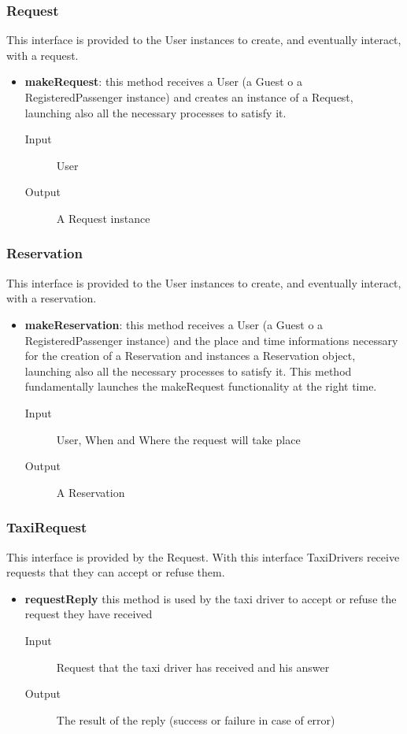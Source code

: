 		\subsubsection{Request}
		This interface is provided to the User instances to create, and eventually interact, with a request.
		\begin{itemize}
			\item \textbf{makeRequest}: this method receives a User (a Guest o a RegisteredPassenger instance)
			and creates	an instance of a Request, launching also all the necessary processes to satisfy it.
			\begin{description}
				\item[Input] User
				\item[Output] A Request instance
			\end{description}
		\end{itemize}
		\subsubsection{Reservation}
		This interface is provided to the User instances to create, and eventually interact, with a reservation.
		\begin{itemize}
			\item \textbf{makeReservation}: this method receives a User (a Guest o a RegisteredPassenger instance)
			and the place and time informations necessary for the creation of a Reservation and instances a
			Reservation object, launching also all the necessary processes to satisfy it. This method fundamentally
			launches the makeRequest functionality at the right time.
			\begin{description}
				\item[Input] User, When and Where the request will take place
				\item[Output] A Reservation
			\end{description}
		\end{itemize}
		\subsubsection{TaxiRequest} 
		This interface is provided by the Request. With this interface TaxiDrivers receive requests that they can accept or refuse them.
		\begin{itemize}
			\item \textbf{requestReply} this method is used by the taxi driver to accept or refuse the request they have received
			\begin{description}
				\item[Input] Request that the taxi driver has received and his answer
				\item[Output] The result of the reply (success or failure in case of error)
			\end{description}
		\end{itemize}
